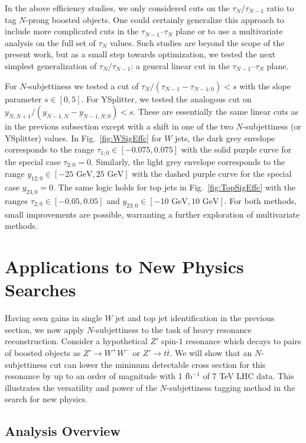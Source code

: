 \documentclass{JHEP3}
\DeclareRobustCommand{\Fig}[1]{Fig.~\ref{#1}}
\begin{document}
In the above efficiency studies, we only considered cuts on the $\tau_{N}/\tau_{N-1}$ ratio to tag $N$-prong boosted objects.  One could certainly generalize this approach to include more complicated cuts in the $\tau_{N-1}$--$\tau_{N}$ plane or to use a multivariate analysis on the full set of $\tau_N$ values.  Such studies are beyond the scope of the present work, but as a small step towards optimization, we tested the next simplest generalization of $\tau_{N}/\tau_{N-1}$: a general linear cut in the $\tau_{N-1}$--$\tau_{N}$ plane.

For $N$-subjettiness we tested a cut of $\tau_{N}/(\tau_{N-1} - \tau_{N-1;0}) < s$ with the slope parameter $s \in [0,5]$.  For YSplitter, we tested the analogous cut on $y_{N,N+1}/(y_{N-1,N} - y_{N-1,N;0}) < s$.  These are essentially the same linear cuts as in the previous subsection except with a shift in one of the two $N$-subjettiness (or YSplitter) values.  In \Fig{fig:WSigEffc} for $W$ jets, the dark grey envelope corresponds to the range $\tau_{1;0} \in [-0.075, 0.075]$ with the solid purple curve for the special case $\tau_{2;0} = 0$.  Similarly, the light grey envelope corresponds to the range $y_{12;0} \in [-25 \text{ GeV}, 25 \text{ GeV}]$ with the dashed purple curve for the special case $y_{23,0} = 0$.  The same logic holds for top jets in \Fig{fig:TopSigEffc} with the ranges $\tau_{2;0} \in [-0.05, 0.05]$ and $y_{23;0} \in [-10 \text{ GeV}, 10 \text{ GeV}]$.  For both methods, small improvements are possible, warranting a further exploration of multivariate methods.

\section{Applications to New Physics Searches}
\label{sec:case}

Having seen gains in single $W$ jet and top jet identification in the previous section, we now apply $N$-subjettiness to the task of heavy resonance reconstruction.  Consider a hypothetical $Z'$ spin-$1$ resonance which decays to pairs of boosted objects as $Z' \rightarrow W^+ W^-$ or $Z' \rightarrow t \overline{t}$.  We will show that an $N$-subjettiness cut can lower the minimum detectable cross section for this resonance by up to an order of magnitude with 1 fb$^{-1}$ of 7 TeV LHC data.  This illustrates the versatility and power of the $N$-subjettiness tagging method in the search for new physics.  

\subsection{Analysis Overview}
\label{sec:analysisz}
\end{document}
